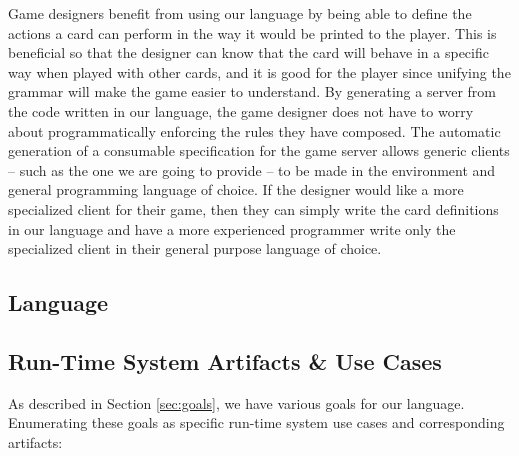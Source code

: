 \documentclass{acm_proc_article-sp}
\begin{document}
Game designers benefit from using our language by being able to define the actions a card
can perform in the way it would be printed to the player. This is beneficial so that the designer
can know that the card will behave in a specific way when played with other cards, and it is good for
the player since unifying the grammar will make the game easier to understand. By generating a server
from the code written in our language, the game designer does not have to worry about programmatically 
enforcing the rules they have composed. The automatic generation of a consumable specification for the 
game server allows generic clients -- such as the one we are going to provide -- to be made in the environment
and general programming language of choice. If the designer would like a more specialized client for their game,
then they can simply write the card definitions in our language and have a more experienced programmer write
only the specialized client in their general purpose language of choice.


\subsection{Language}
\label{sec:language}


\subsection{Run-Time System Artifacts \& Use Cases}
\label{sec:runtime_system}

As described in Section \ref{sec:goals}, we have various goals for our
language. Enumerating these goals as specific run-time system use cases
and corresponding artifacts:
\end{document}
